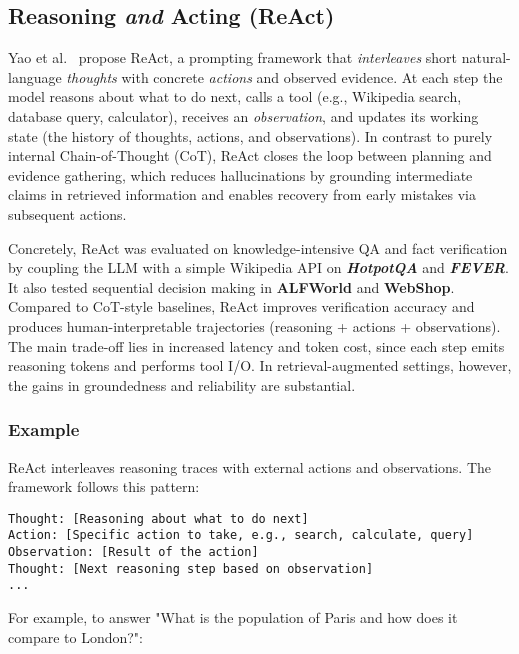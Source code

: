 \subsection{Reasoning \emph{and} Acting (ReAct)}
Yao et al.~\cite{react} propose ReAct, a prompting framework that \emph{interleaves} short natural-language \textit{thoughts} with concrete \textit{actions} and observed evidence. At each step the model reasons about what to do next, calls a tool (e.g., Wikipedia search, database query, calculator), receives an \textit{observation}, and updates its working state (the history of thoughts, actions, and observations). In contrast to purely internal Chain-of-Thought (CoT), ReAct closes the loop between planning and evidence gathering, which reduces hallucinations by grounding intermediate claims in retrieved information and enables recovery from early mistakes via subsequent actions.

Concretely, ReAct was evaluated on knowledge-intensive QA and fact verification by coupling the LLM with a simple Wikipedia API on \textbf{\textit{HotpotQA}} and \textbf{\textit{FEVER}}. It also tested sequential decision making in \textbf{ALFWorld} and \textbf{WebShop}. Compared to CoT-style baselines, ReAct improves verification accuracy and produces human-interpretable trajectories (reasoning + actions + observations). The main trade-off lies in increased latency and token cost, since each step emits reasoning tokens and performs tool I/O. In retrieval-augmented settings, however, the gains in groundedness and reliability are substantial.



\subsubsection{Example}
ReAct interleaves reasoning traces with external actions and observations. The framework follows this pattern:

\begin{lstlisting}[language={},basicstyle=\ttfamily\footnotesize,caption={ReAct Framework Pattern}]
Thought: [Reasoning about what to do next]
Action: [Specific action to take, e.g., search, calculate, query]
Observation: [Result of the action]
Thought: [Next reasoning step based on observation]
...
\end{lstlisting}

For example, to answer "What is the population of Paris and how does it compare to London?":


